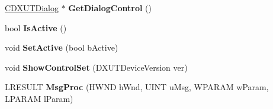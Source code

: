 \begin{DoxyCompactItemize}
\item 
\hypertarget{class_c_d3_d_settings_dlg_a0c5cd502ae62c1460d989e2e51590ab4}{\hyperlink{class_c_d_x_u_t_dialog}{C\+D\+X\+U\+T\+Dialog} $\ast$ {\bfseries Get\+Dialog\+Control} ()}\label{class_c_d3_d_settings_dlg_a0c5cd502ae62c1460d989e2e51590ab4}

\item 
\hypertarget{class_c_d3_d_settings_dlg_a1bf2d86e2af7d854ed904035e15677bd}{bool {\bfseries Is\+Active} ()}\label{class_c_d3_d_settings_dlg_a1bf2d86e2af7d854ed904035e15677bd}

\item 
\hypertarget{class_c_d3_d_settings_dlg_a78ee87995db6417e18e597610f119212}{void {\bfseries Set\+Active} (bool b\+Active)}\label{class_c_d3_d_settings_dlg_a78ee87995db6417e18e597610f119212}

\item 
\hypertarget{class_c_d3_d_settings_dlg_a75a05e4c23d2f56d318aa67c9e76e368}{void {\bfseries Show\+Control\+Set} (D\+X\+U\+T\+Device\+Version ver)}\label{class_c_d3_d_settings_dlg_a75a05e4c23d2f56d318aa67c9e76e368}

\item 
\hypertarget{class_c_d3_d_settings_dlg_a8a3ecd505c89b0bba30aabce63534a31}{L\+R\+E\+S\+U\+L\+T {\bfseries Msg\+Proc} (H\+W\+N\+D h\+Wnd, U\+I\+N\+T u\+Msg, W\+P\+A\+R\+A\+M w\+Param, L\+P\+A\+R\+A\+M l\+Param)}\label{class_c_d3_d_settings_dlg_a8a3ecd505c89b0bba30aabce63534a31}

\end{DoxyCompactItemize}
